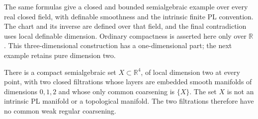The same formulas give a closed and bounded semialgebraic example
over every real closed field, with definable smoothness and the
intrinsic finite PL convention.  The chart and its inverse are
defined over that field, and the final contradiction uses local
definable dimension.  Ordinary compactness is asserted here only
over $\mathbb R$.  This three-dimensional construction has a
one-dimensional part; the next example retains pure dimension two.

\begin{proposition}
\label{prop:weak-filtration-pure-r4}
There is a compact semialgebraic set $X\subset\mathbb R^4$, of
local dimension two at every point, with two closed filtrations
whose layers are embedded smooth manifolds of dimensions $0,1,2$
and whose only common coarsening is $\{X\}$.  The set $X$ is not
an intrinsic PL manifold or a topological manifold.  The two
filtrations therefore have no common weak regular coarsening.
\end{proposition}

